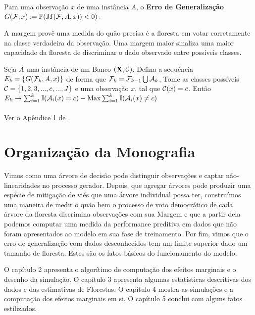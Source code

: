   
  \begin{defi}
 Para uma observação $x$ de uma instância $A$, o \textbf{Erro de Generalização} $G(\mathcal{F}, x) := \mathbb{P} (M(\mathcal{F}, A, x)) < 0)$.  \end{defi}
  
  A margem provê uma medida do quão precisa é a floresta em votar corretamente na classe verdadeira da observação. Uma margem maior sinaliza uma maior capacidade da floresta de discriminar o dado observado entre possíveis classes.  

 \begin{teo} Seja $A$ uma instância de um Banco $(\mathbf{X}, \mathcal{C})$. Defina a sequência $E_k = \{ G(\mathcal{F}_k, A, x) \}$ de forma que $\mathcal{F}_k = \mathcal{F}_{k-1} \bigcup \mathcal{A}_k $,  Tome as classes possíveis $\mathcal{C} = \{1,2,3,...,c,...,J \}$ e uma observação $x$, tal que $\mathcal{C}(x) = c$. Então $E_k \to \sum_{i=1}^k \mathbb{I} ( \mathcal{A}_i (x) = c ) - \underset{}{\text{Max}} \sum_{i=1}^k \mathbb{I}  ( \mathcal{A}_i (x) \neq c) $
 
 \end{teo}
 
 \begin{prova}
 Ver o Apêndice 1 de \cite{breiman2001random}. \blacksquare
 \end{prova}
 
 \section{Organização da Monografia}
 
 Vimos como uma árvore de decisão pode distinguir observações e captar não-linearidades no processo gerador. Depois, que agregar árvores pode produzir uma espécie de mitigação de viés que uma árvore individual possa ter, construímos uma maneira de medir o quão bem o processo de voto democrático de cada árvore da floresta discrimina observações com sua Margem e que a partir dela podemos computar uma medida da performance preditiva em dados que não foram apresentados ao modelo em sua fase de treinamento. Por fim, vimos que o erro de generalização com dados desconhecidos tem um limite superior dado um tamanho de floresta. Estes são os fatos básicos do funcionamento do modelo.
 
 O capítulo 2 apresenta o algorítimo de computação dos efeitos marginais e o desenho da simulação. O capítulo 3 apresenta algumas estatísticas descritivas dos dados e das estimativas de Florestas. O capítulo 4 mostra as simulações e a computação dos efeitos marginais em si. O capítulo 5 conclui com alguns fatos estilizados.


